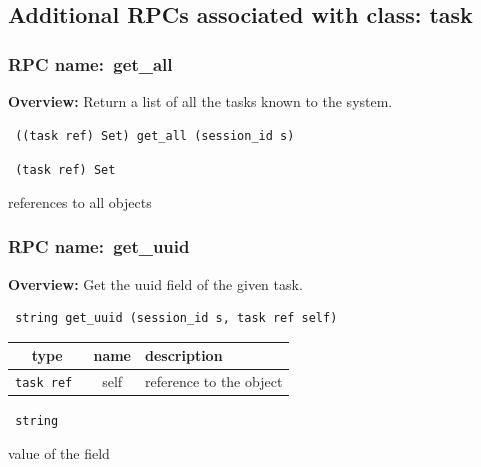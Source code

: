 \subsection{Additional RPCs associated with class: task}
\subsubsection{RPC name:~get\_all}

{\bf Overview:} 
Return a list of all the tasks known to the system.

\begin{verbatim} ((task ref) Set) get_all (session_id s)\end{verbatim}


\vspace{0.3cm}

{\tt 
(task ref) Set
}


references to all objects
\vspace{0.3cm}
\vspace{0.3cm}
\vspace{0.3cm}
\subsubsection{RPC name:~get\_uuid}

{\bf Overview:} 
Get the uuid field of the given task.

\begin{verbatim} string get_uuid (session_id s, task ref self)\end{verbatim}



 
\vspace{0.3cm}
\begin{tabular}{|c|c|p{7cm}|}
 \hline
{\bf type} & {\bf name} & {\bf description} \\ \hline
{\tt task ref } & self & reference to the object \\ \hline 

\end{tabular}

\vspace{0.3cm}

{\tt 
string
}


value of the field
\vspace{0.3cm}
\vspace{0.3cm}
\vspace{0.3cm}
